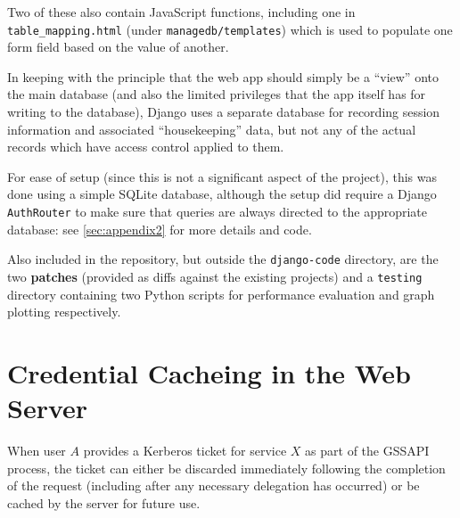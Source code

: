 \documentclass[12pt]{report}
\begin{document}
Two of these also contain JavaScript functions, including one in \verb+table_mapping.html+ (under \verb+managedb/templates+) which is used to populate one form field based on the value of another.

In keeping with the principle that the web app should simply be a ``view'' onto the main database (and also the limited privileges that the app itself has for writing to the database), Django uses a separate database for recording session information and associated ``housekeeping'' data, but not any of the actual records which have access control applied to them.

For ease of setup (since this is not a significant aspect of the project), this was done using a simple SQLite database, although the setup did require a Django \texttt{AuthRouter} to make sure that queries are always directed to the appropriate database: see \autoref{sec:appendix2} for more details and code.

Also included in the repository, but outside the \verb+django-code+ directory, are the two \textbf{patches} (provided as diffs against the existing projects) and a \verb+testing+ directory containing two Python scripts for performance evaluation and graph plotting respectively.

\section{Credential Cacheing in the Web Server}
\label{sec:credential_cacheing}
When user $A$ provides a Kerberos ticket for service $X$ as part of the GSSAPI process, the ticket can either be discarded immediately following the completion of the request (including after any necessary delegation has occurred) or be cached by the server for future use.
\end{document}
